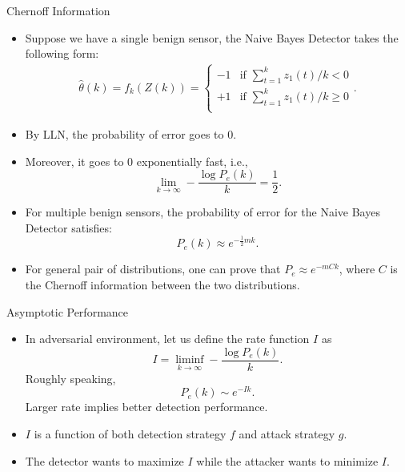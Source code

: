 \documentclass[10pt]{beamer}
\begin{document}
\begin{frame}{Chernoff Information}
  \begin{itemize}
  \item Suppose we have a single benign sensor, the Naive Bayes Detector takes the following form:
    \begin{align*}
      \hat \theta(k)=f_k(Z(k))=\begin{cases}
        -1 &\text{if }\sum_{t=1}^k z_1(t)/k < 0\\
        +1 &\text{if }\sum_{t=1}^k z_1(t)/k \geq 0\\
      \end{cases}.
    \end{align*}
  \item By LLN, the probability of error goes to $0$.
  \item Moreover, it goes to $0$ exponentially fast, i.e.,
    \begin{displaymath}
      \lim_{k\rightarrow\infty}-\frac{\log P_e(k)}{k}= \frac{1}{2}.
    \end{displaymath}
  \item For multiple benign sensors, the probability of error for the Naive Bayes Detector satisfies:
    \begin{displaymath}
      P_e(k)\approx e^{-\frac{1}{2}mk}.
    \end{displaymath}
  \item For general pair of distributions, one can prove that $P_e \approx e^{-mCk}$, where $C$ is the Chernoff information between the two distributions.
  \end{itemize}
\end{frame}

\begin{frame}{Asymptotic Performance}
  \begin{itemize}
  \item In adversarial environment, let us define the rate function $I$ as
    \begin{displaymath}
      I = \liminf_{k\rightarrow\infty} -\frac{\log P_e(k)}{k}.
    \end{displaymath}
    Roughly speaking, 
    \begin{displaymath}
      P_e(k)\sim e^{-Ik}. 
    \end{displaymath}
    Larger rate implies better detection performance.
  \item  $I$ is a function of both detection strategy $f$ and attack strategy $g$.
  \item The detector wants to maximize $I$ while the attacker wants to minimize $I$.
  \end{itemize}
\end{frame}
\end{document}
